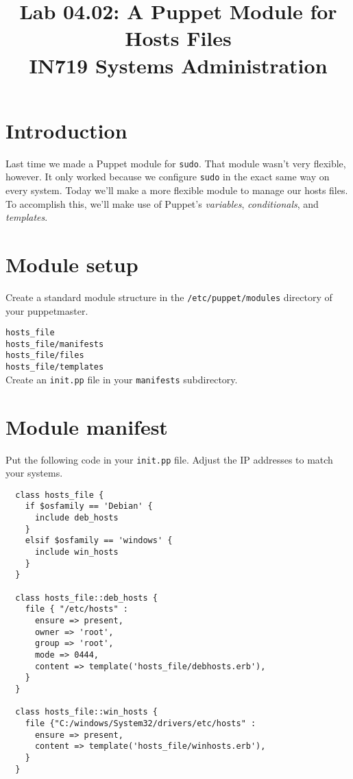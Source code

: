 \documentclass{article}   	%
\title{Lab 04.02: A Puppet Module for Hosts Files \\ IN719 Systems Administration}
\date{}							%
\begin{document}
\maketitle

\section*{Introduction}
Last time we made a Puppet module for \texttt{sudo}.  That module wasn't very flexible, however.  It only worked because we configure \texttt{sudo} in the exact same way on every system. Today we'll make a more flexible module to manage our hosts files.  To accomplish this, we'll make use of Puppet's \emph{variables}, \emph{conditionals}, and \emph{templates}.

\section{Module setup}
Create a standard module structure in the \texttt{/etc/puppet/modules} directory of your puppetmaster.

\texttt{hosts\_file} \\
\texttt{hosts\_file/manifests} \\
\texttt{hosts\_file/files} \\
\texttt{hosts\_file/templates} \\

Create an \texttt{init.pp} file in your \texttt{manifests} subdirectory.

\section{Module manifest}
Put the following code in your \texttt{init.pp} file.  Adjust the IP addresses to match your systems.

\begin{verbatim}
  class hosts_file {
    if $osfamily == 'Debian' {
      include deb_hosts
    }
    elsif $osfamily == 'windows' {
      include win_hosts
    }
  }

  class hosts_file::deb_hosts {
    file { "/etc/hosts" :
      ensure => present,
      owner => 'root',
      group => 'root',
      mode => 0444,
      content => template('hosts_file/debhosts.erb'),
    }
  }

  class hosts_file::win_hosts {
    file {"C:/windows/System32/drivers/etc/hosts" :
      ensure => present,
      content => template('hosts_file/winhosts.erb'),
    }
  }
  
\end{verbatim}
\end{document}
